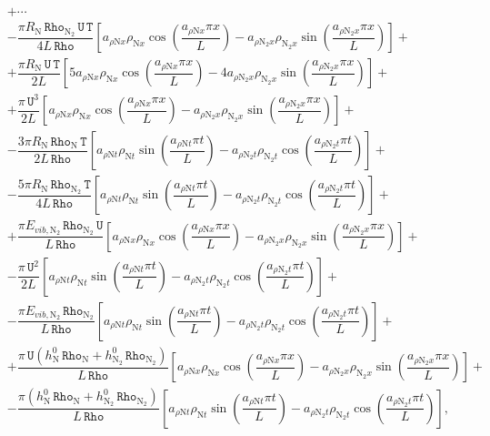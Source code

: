 \documentclass[10pt]{article}
\newcommand{\Rho}{\,\mathtt{Rho}}
\newcommand{\T}{\,\mathtt{T}}
\newcommand{\U}{\,\mathtt{U}}
\begin{document}
\begin{equation}
\begin{split}
&+\cdots\\
&- \dfrac{ \pi R_\text{N}  \Rho_{\text{N}_2} \U \T}{4L \Rho}\left[a_{ \rho \text{N} x} \rho_{\text{N} x}  \cos\left(\dfrac{a_{ \rho \text{N} x} \pi x}{L}\right)-a_{ \rho \text{N}_2 x} \rho_{\text{N}_2 x}  \sin\left(\dfrac{a_{ \rho \text{N}_2 x} \pi x}{L}\right)\right]  +\\
&+\dfrac{\pi R_\text{N}  \U \T}{2L}\left[5 a_{ \rho \text{N} x} \rho_{\text{N} x}  \cos\left(\dfrac{a_{ \rho \text{N} x} \pi x}{L}\right)-4 a_{ \rho \text{N}_2 x} \rho_{\text{N}_2 x}  \sin\left(\dfrac{a_{ \rho \text{N}_2 x} \pi x}{L}\right)\right]   +\\
&+  \dfrac{\pi \U^3}{2L}\left[a_{ \rho \text{N} x} \rho_{\text{N} x}  \cos\left(\dfrac{a_{ \rho \text{N} x} \pi x}{L}\right)-a_{ \rho \text{N}_2 x} \rho_{\text{N}_2 x}  \sin\left(\dfrac{a_{ \rho \text{N}_2 x} \pi x}{L}\right)\right]  +\\
&- \dfrac{3\pi R_\text{N}  \Rho_\text{N}  \T}{2L \Rho}\left[a_{ \rho \text{N} t} \rho_{\text{N} t}  \sin\left(\dfrac{a_{ \rho \text{N} t} \pi t}{L}\right)-a_{ \rho \text{N}_2 t} \rho_{\text{N}_2 t}  \cos\left(\dfrac{a_{ \rho \text{N}_2 t} \pi t}{L}\right)\right]  +\\
&-\dfrac{5\pi R_\text{N}  \Rho_{\text{N}_2} \T}{4L \Rho}\left[a_{ \rho \text{N} t} \rho_{\text{N} t}  \sin\left(\dfrac{a_{ \rho \text{N} t} \pi t}{L}\right)-a_{ \rho \text{N}_2 t} \rho_{\text{N}_2 t}  \cos\left(\dfrac{a_{ \rho \text{N}_2 t} \pi t}{L}\right)\right]   +\\
&+ \dfrac{ \pi E_{vib, \text{N}_2} \Rho_{\text{N}_2} \U}{L \Rho}\left[a_{ \rho \text{N} x} \rho_{\text{N} x}  \cos\left(\dfrac{a_{ \rho \text{N} x} \pi x}{L}\right)-a_{ \rho \text{N}_2 x} \rho_{\text{N}_2 x}  \sin\left(\dfrac{a_{ \rho \text{N}_2 x} \pi x}{L}\right)\right] +\\
&-\dfrac{\pi \U^2}{2L}\left[a_{ \rho \text{N} t} \rho_{\text{N} t}  \sin\left(\dfrac{a_{ \rho \text{N} t} \pi t}{L}\right)-a_{ \rho \text{N}_2 t} \rho_{\text{N}_2 t}  \cos\left(\dfrac{a_{ \rho \text{N}_2 t} \pi t}{L}\right)\right]  +\\
&- \dfrac{\pi E_{vib, \text{N}_2} \Rho_{\text{N}_2}}{L \Rho}\left[a_{ \rho \text{N} t} \rho_{\text{N} t}  \sin\left(\dfrac{a_{ \rho \text{N} t} \pi t}{L}\right)-a_{ \rho \text{N}_2 t} \rho_{\text{N}_2 t}  \cos\left(\dfrac{a_{ \rho \text{N}_2 t} \pi t}{L}\right)\right]  +\\
&+\dfrac{\pi \U (h^0_\text{N} \Rho_\text{N} +h^0_{\text{N}_2} \Rho_{\text{N}_2}) }{L \Rho}\left[a_{ \rho \text{N} x} \rho_{\text{N} x}  \cos\left(\dfrac{a_{ \rho \text{N} x} \pi x}{L}\right)-a_{ \rho \text{N}_2 x} \rho_{\text{N}_2 x}  \sin\left(\dfrac{a_{ \rho \text{N}_2 x} \pi x}{L}\right)\right]  +\\
&-\dfrac{ \pi (h^0_\text{N} \Rho_\text{N} +h^0_{\text{N}_2} \Rho_{\text{N}_2})}{L \Rho}\left[a_{ \rho \text{N} t} \rho_{\text{N} t}  \sin\left(\dfrac{a_{ \rho \text{N} t} \pi t}{L}\right)-a_{ \rho \text{N}_2 t} \rho_{\text{N}_2 t}  \cos\left(\dfrac{a_{ \rho \text{N}_2 t} \pi t}{L}\right)\right] ,
\end{split}
\end{equation}
\end{document}
